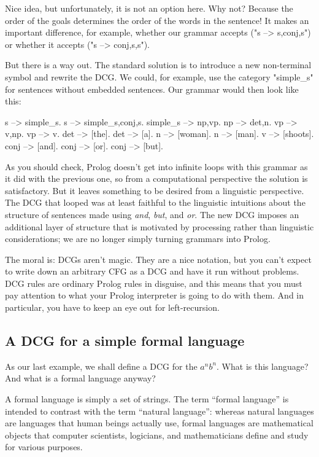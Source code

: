 Nice idea, but unfortunately, it is not an option here.  Why not?
Because the order of the goals determines the order of the words in
the sentence!  It makes an important difference, for example, whether
our grammar accepts  ("s --> s,conj,s") or whether it accepts
 ("s --> conj,s,s").

But there is a way out.
The standard solution is to introduce a new non-terminal symbol and
rewrite the DCG.  We could, for example, use the category "simple\_s"
for sentences without embedded sentences. Our grammar would then look
like this:
\begin{LPNcodedisplay}
s --> simple_s.
s --> simple_s,conj,s.
simple_s --> np,vp.
np --> det,n.
vp --> v,np.
vp --> v.
det --> [the].
det --> [a].
n --> [woman].
n --> [man].
v --> [shoots].
conj --> [and].
conj --> [or].
conj --> [but].
\end{LPNcodedisplay}
As you should check, Prolog doesn't get into infinite loops with this
grammar as it did with the previous one, so from a computational
perspective the solution is satisfactory. But it leaves something to
be desired from a linguistic perspective. The DCG that looped was at
least faithful to the linguistic intuitions about the structure of
sentences made using \textit{and}, \textit{but}, and \textit{or}.  The
new DCG imposes an additional layer of structure that is motivated by
processing rather than linguistic considerations; we are no longer
simply turning grammars into Prolog.

The moral is: DCGs aren't magic. They are a nice notation, but you
can't expect to write down an arbitrary CFG as a DCG and have it run
without problems. DCG rules are ordinary Prolog rules in disguise, and
this means that you must pay attention to what your Prolog interpreter
is going to do with them. And in particular, you have to keep an eye
out for left-recursion.


\subsection*{A DCG for a simple formal language}\label{SUBSEC.L7.ANBN}

As our last example, we shall define a DCG for the  $a^nb^n$. What is this language? And what is a formal
language anyway?

 A formal language is simply a set of strings. The term ``formal
language'' is intended to contrast with the term ``natural language'':
whereas natural languages are languages that human beings actually
use, formal languages are mathematical objects that computer
scientists, logicians, and mathematicians define and study for various
purposes.

